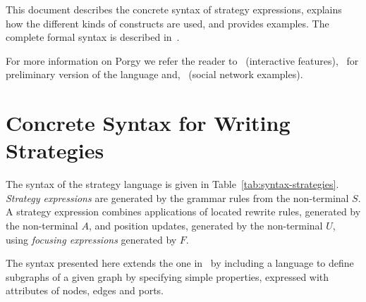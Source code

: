 \documentclass[a4paper,10pt,runningheads]{llncs}
\newcommand{\PORGY}{{\sc Porgy}\xspace}
\begin{document}
This document describes the concrete syntax of strategy expressions, explains how 
 the different kinds of constructs  %
are used, and provides examples. The complete formal syntax is described in~\cite{fernandezhal-01251871}.%
 
For more information on \PORGY we refer the reader to~\cite{pinaud:hal-00682550} (interactive features),~\cite{fernandezhal-01251871} for preliminary version of the language and,~\cite{fernandez2018} (social network examples).


\section*{Concrete Syntax for Writing Strategies}\label{syntaxgrammar}
The syntax of the strategy language is given in Table~\ref{tab:syntax-strategies}.
\emph{Strategy expressions} are generated by the grammar rules from
the non-terminal $S$. A strategy expression combines applications of
located rewrite rules, generated by the non-terminal $A$, and position
updates, generated by the non-terminal $U$, using \emph{focusing
  expressions} generated by $F$.  
  
The syntax presented here extends the one in~\cite{FKN:Lopstr} by
including a language to define subgraphs of a given graph by specifying
simple properties, expressed with attributes of nodes, edges and ports.
\end{document}
